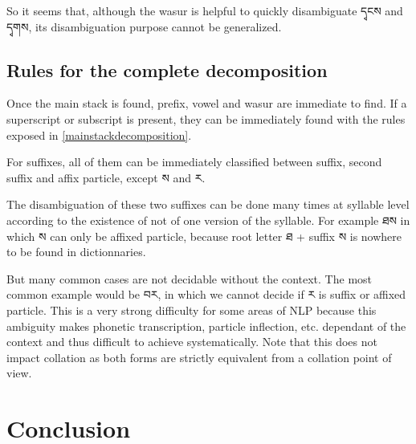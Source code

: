 \documentclass[%
a4paper,%
pagesize,%
12pt,%
parskip=off,%
bibliography=totoc,%
numbers=noenddot,%
DIV=12,%
twoside=semi,%
headings=normal%
]{scrartcl}
\begin{document}
So it seems that, although the wasur is helpful to quickly disambiguate དྭངས and དྭགས, its disambiguation purpose cannot be generalized.

\subsection{Rules for the complete decomposition}

Once the main stack is found, prefix, vowel and wasur are immediate to find. If a superscript or subscript is present, they can be immediately found with the rules exposed in \ref{mainstackdecomposition}.

For suffixes, all of them can be immediately classified between suffix, second suffix and affix particle, except ས and ར. 

The disambiguation of these two suffixes can be done many times at syllable level according to the existence of not of one version of the syllable. For example ཐས in which ས can only be affixed particle, because root letter ཐ + suffix ས is nowhere to be found in dictionnaries. 

But many common cases are not decidable without the context. The most common example would be བར, in which we cannot decide if ར is suffix or affixed particle. This is a very strong difficulty for some areas of NLP because this ambiguity makes phonetic transcription, particle inflection, etc. dependant of the context and thus difficult to achieve systematically. Note that this does not impact collation as both forms are strictly equivalent from a collation point of view.

\section{Conclusion}

­



\end{document}
